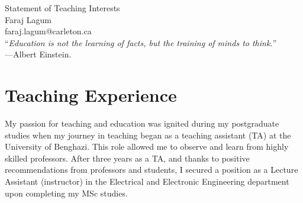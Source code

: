 \documentclass[11pt]{article}
\begin{document}
\begin{center}
{\Large Statement of Teaching Interests} \\[.3in]
{\large Faraj Lagum}\\
faraj.lagum@carleton.ca \\
\vspace*{.5in}
{``\emph{Education is not the learning of facts, but the training of minds to think.}'' \\ ---Albert Einstein.}
\end{center}








\section{Teaching Experience}
My passion for teaching and education was ignited during my postgraduate studies when my journey in teaching began as a teaching assistant (TA) at the University of Benghazi. This role allowed me to observe and learn from highly skilled professors. %
After three years as a TA, and thanks to positive recommendations from professors and students, I secured a position as a Lecture Assistant (instructor) in the Electrical and Electronic Engineering department upon completing my MSc studies.
\end{document}
